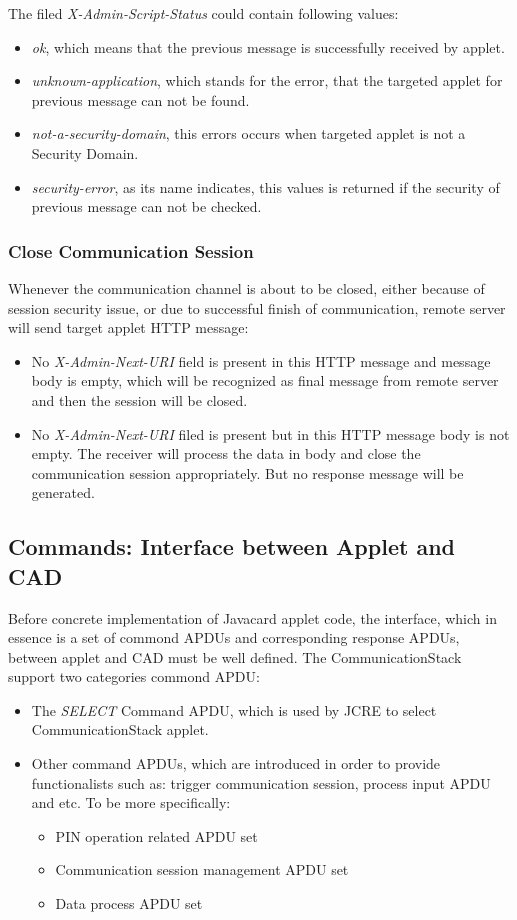 The filed \emph{X-Admin-Script-Status} could contain following values:
 \begin{itemize}
  \item \emph{ok}, which means that the previous message is successfully received by applet.
  \item \emph{unknown-application}, which stands for the error, that the targeted applet for previous message can not be found.
\item \emph{not-a-security-domain}, this errors occurs when targeted applet is not a Security Domain.
\item \emph{security-error}, as its name indicates, this values is returned if the security of previous message  can not be checked.
\end{itemize}

\subsubsection{Close Communication Session}
Whenever the communication channel is about to be closed, either because of session security issue, or due to successful finish of communication, remote server will send target applet HTTP message:
 \begin{itemize}
  \item No \emph{X-Admin-Next-URI} field is present in this HTTP message and message body is empty, which will be recognized as final message from remote server and then the session will be closed.
  \item No \emph{X-Admin-Next-URI} filed is present but in this HTTP message body is not empty. The receiver will process the data in body and close the communication session appropriately. But no response message will be generated.
\end{itemize}

\subsection {Commands: Interface between Applet and CAD}
Before concrete implementation of Javacard applet code, the interface, which in essence is a set of commond APDUs and corresponding response APDUs, between applet and CAD must be well defined.  The CommunicationStack support two categories commond APDU:
 \begin{itemize}
  \item The \emph{SELECT} Command APDU, which is used by JCRE to select CommunicationStack applet.
  \item Other command APDUs, which are introduced in order to provide functionalists such as: trigger communication session, process input APDU and etc. To be more specifically:
\begin{itemize}
  \item PIN operation related APDU set
  \item Communication session management APDU set
  \item Data process APDU set
\end{itemize}
\end{itemize}

